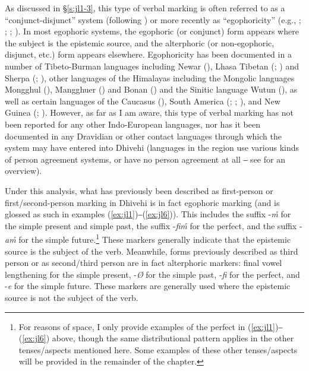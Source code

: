 \documentclass[output=paper]{langsci/langscibook}
\begin{document}
As discussed in §\ref{s:jl1-3}, this type of verbal marking is often referred to as a “conjunct-disjunct” system (following \citealt{Hale1980}) or more recently as “egophoricity” (e.g., \citealt{Tournadre1992}; \citeyear{Tournadre1994}; \citealt{Post2013}; \citealt{Floydetal2018}). In most egophoric systems, the egophoric (or conjunct) form appears where the subject is the epistemic source, and the alterphoric (or non-egophoric, disjunct, etc.) form appears elsewhere. Egophoricity has been documented in a number of Tibeto-Burman languages including Newar (\citealt{Hale1980}), Lhasa Tibetan (\citealt{DeLancey1992}; \citeyear{DeLancey2001}) and Sherpa (\citealt{Schottelndreyer1980}; \citealt{Kelly2004}), other languages of the Himalayas including the Mongolic languages Mongghul (\citealt{Akerman2012}), Mangghuer (\citealt{Slater2003}) and Bonan (\citealt{Fried2010}) and the Sinitic language Wutun (\citealt{Sandman2016}), as well as certain languages of the Caucasus (\citealt{Creissels2008}), South America (\citealt{Dickinson2000}; \citealt{Curnow2002a}; \citealt{Bergqvist2012}), and New Guinea (\citealt{Loughnane2009}; \citealt{SanRoqueSchieffelin2018}). However, as far as I am aware, this type of verbal marking has not been reported for any other Indo-European languages, nor has it been documented in any Dravidian or other contact languages through which the system may have entered into Dhivehi (languages in the region use various kinds of person agreement systems, or have no person agreement at all ‒ see \citealt{Hock2016} for an overview). 

Under this analysis, what has previously been described as first-person or first/second-person marking in Dhivehi is in fact egophoric marking (and is glossed as such in examples (\ref{ex:jl1})‒(\ref{ex:jl6})). This includes the suffix -\textit{m̊} for the simple present and simple past, the suffix -\textit{fim̊} for the perfect, and the suffix -\textit{am̊} for the simple future.\footnote{For reasons of space, I only provide examples of the perfect in (\ref{ex:jl1})‒(\ref{ex:jl6}) above, though the same distributional pattern applies in the other tenses/aspects mentioned here. Some examples of these other tenses/aspects will be provided in the remainder of the chapter.} 
These markers generally indicate that the epistemic source is the subject of the verb. Meanwhile, forms previously described as third person or as second/third person are in fact alterphoric markers: final vowel lengthening for the simple present, -\textit{Ø} for the simple past, ‑\textit{fi} for the perfect, and -\textit{e} for the simple future. These markers are generally used where the epistemic source is not the subject of the verb. 
\end{document}
